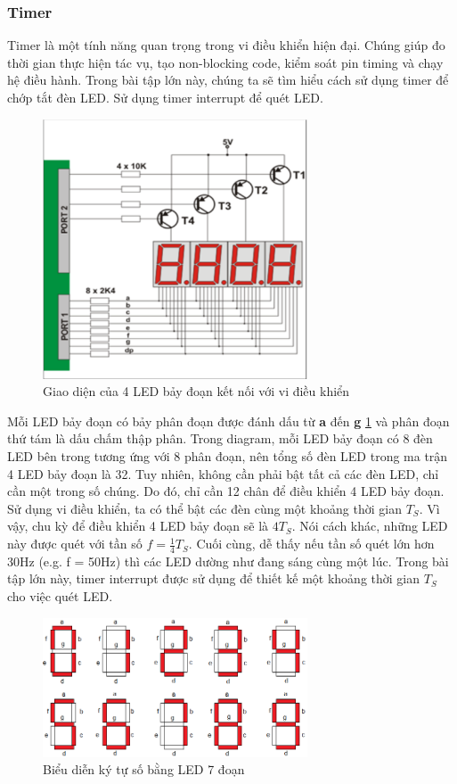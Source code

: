 \subsubsection{Timer}
Timer là một tính năng quan trọng trong vi điều khiển hiện đại. Chúng giúp đo thời gian thực hiện tác vụ, tạo non-blocking code, kiểm soát pin timing và chạy hệ điều hành. Trong bài tập lớn này, chúng ta sẽ tìm hiểu cách sử dụng timer để chớp tắt đèn LED. Sử dụng timer interrupt để quét LED.
\begin{figure}[ht]
    \centering
    \includegraphics[width=0.7\textwidth]{graphics/LED_7seg.PNG}
    \caption{Giao diện của 4 LED bảy đoạn kết nối với vi điều khiển}
\end{figure}

Mỗi LED bảy đoạn có bảy phân đoạn được đánh dấu từ \textbf{a} đến \textbf{g} \ref{digit} và phân đoạn thứ tám là dấu chấm thập phân. Trong diagram, mỗi LED bảy đoạn có 8 đèn LED bên trong tương ứng với 8 phân đoạn, nên tổng số đèn LED trong ma trận 4 LED bảy đoạn là 32. Tuy nhiên, không cần phải bật tất cả các đèn LED, chỉ cần một trong số chúng. Do đó, chỉ cần 12 chân để điều khiển 4 LED bảy đoạn. Sử dụng vi điều khiển, ta có thể bật các đèn cùng một khoảng thời gian $T_S$. Vì vậy, chu kỳ để  điều khiển 4 LED bảy đoạn sẽ là $4T_S$. Nói cách khác, những LED này được quét với  tần số $f = \frac{1}{4} T_S$. Cuối cùng, dễ thấy nếu tần số quét lớn hơn 30Hz (e.g. f = 50Hz)  thì các LED dường như đang sáng cùng một lúc. Trong bài tập lớn này, timer interrupt được sử dụng để thiết kế một khoảng thời gian $T_S$ cho việc quét LED.
\begin{figure}[ht]
    \centering
    \includegraphics[width=0.7\textwidth]{graphics/digit_Led7.png}
    \caption{Biểu diễn ký tự số bằng LED 7 đoạn}
    \label{digit}
\end{figure}


